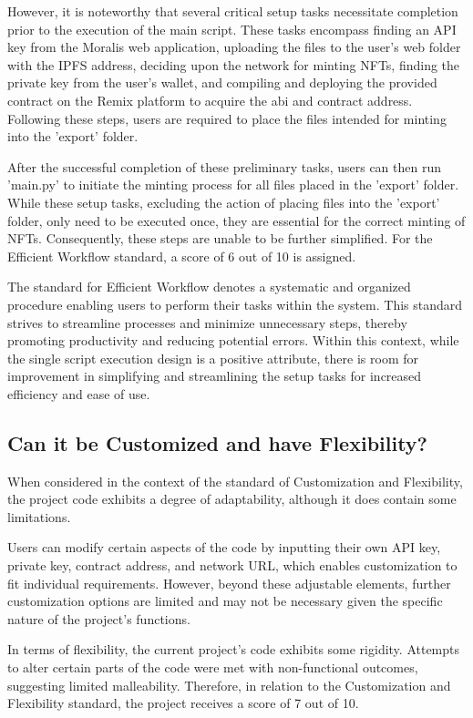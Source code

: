 \documentclass[10pt,twocolumn]{article}
\begin{document}
However, it is noteworthy that several critical setup tasks necessitate completion prior to the execution of the main script. These tasks encompass finding an API key from the Moralis web application, uploading the files to the user's web folder with the IPFS address, deciding upon the network for minting NFTs, finding the private key from the user's wallet, and compiling and deploying the provided contract on the Remix platform to acquire the abi and contract address. Following these steps, users are required to place the files intended for minting into the 'export' folder.

After the successful completion of these preliminary tasks, users can then run 'main.py' to initiate the minting process for all files placed in the 'export' folder. While these setup tasks, excluding the action of placing files into the 'export' folder, only need to be executed once, they are essential for the correct minting of NFTs. Consequently, these steps are unable to be further simplified. For the Efficient Workflow standard, a score of 6 out of 10 is assigned.

The standard for Efficient Workflow denotes a systematic and organized procedure enabling users to perform their tasks within the system. This standard strives to streamline processes and minimize unnecessary steps, thereby promoting productivity and reducing potential errors. Within this context, while the single script execution design is a positive attribute, there is room for improvement in simplifying and streamlining the setup tasks for increased efficiency and ease of use.

\subsection{Can it be Customized and have Flexibility?}

When considered in the context of the standard of Customization and Flexibility, the project code exhibits a degree of adaptability, although it does contain some limitations. 

Users can modify certain aspects of the code by inputting their own API key, private key, contract address, and network URL, which enables customization to fit individual requirements. However, beyond these adjustable elements, further customization options are limited and may not be necessary given the specific nature of the project's functions.

In terms of flexibility, the current project's code exhibits some rigidity. Attempts to alter certain parts of the code were met with non-functional outcomes, suggesting limited malleability. Therefore, in relation to the Customization and Flexibility standard, the project receives a score of 7 out of 10.
\end{document}
